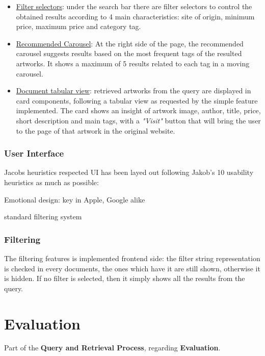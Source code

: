 \documentclass[12pt]{spieman}  %
\begin{document}
\begin{spacing}{1}
    \begin{itemize}
        \item \underline{Filter selectors}: under the search bar there are filter selectors to control the obtained results
              according to 4 main characteristics:
              site of origin, minimum price, maximum price and category tag.
        \item \underline{Recommended Carousel}:
              At the right side of the page, the recommended carousel suggests results based on the most frequent tags
              of the resulted artworks.
              It shows a maximum of 5 results related to each tag in a moving carousel.
        \item \underline{Document tabular view}: retrieved artworks from the query are displayed in card components,
              following a tabular view as requested by the simple feature implemented.
              The card shows an insight of artwork image, author, title, price, short description and main tags,
              with a \textit{"Visit"} button that will bring the user to the page of that artwork in the original website.
    \end{itemize}

    \subsubsection{User Interface}\label{sec:ui}

    Jacobs heuristics respected
    UI has been layed out following Jakob's 10 usability heuristics as much as possible:


    Emotional design: key in Apple, Google alike


    standard filtering system

    \subsubsection{Filtering}\label{sec:filtering}
    The filtering features is implemented frontend side:
    the filter string representation is checked in every documents, the ones which have it are still shown,
    otherwise it is hidden.
    If no filter is selected, then it simply shows all the results from the query.

    \section{Evaluation}\label{sec:evaluation}
    Part of the \textbf{Query and Retrieval Process}, regarding \textbf{Evaluation}.\\



\end{spacing}
\end{document}
